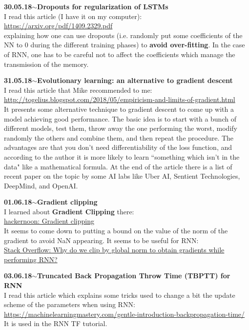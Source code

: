 \documentclass[11pt,a4paper]{article}
\newenvironment{loggentry}[2]%
{\noindent\textbf{#1}\hspace{1cm}$\mathbf{\sim}$\text{ }\textbf{#2}\\}{\vspace{0.5cm}}
\begin{document}
\begin{loggentry}{30.05.18}{Dropouts for regularization of LSTMs}
I read this article (I have it on my computer):\\
\url{https://arxiv.org/pdf/1409.2329.pdf}\\
explaining how one can use dropouts (i.e. randomly put some coefficients of the NN to 0 during the different training phases) to \textbf{avoid over-fitting}. In the case of RNN, one has to be careful not to affect the coefficients which manage the transmission of the memory.
\end{loggentry}

\begin{loggentry}{31.05.18}{Evolutionary learning: an alternative to gradient descent}
I read this article that Mike recommended to me:\\
\url{http://togelius.blogspot.com/2018/05/empiricism-and-limits-of-gradient.html}\\
It presents some alternative technique to gradient descent to come up with a model achieving good performance. The basic idea is to start with a bunch of different models, test them, throw away the one performing the worst, modify randomly the others and combine them, and then repeat the procedure. The advantages are that you don't need differentiability of the loss function, and according to the author it is more likely to learn ``something which isn't in the data" like a mathematical formula. At the end of the article there is a list of recent paper on the topic by some AI labs like Uber AI, Sentient Technologies, DeepMind, and OpenAI.\\
\end{loggentry}

\begin{loggentry}{01.06.18}{Gradient clipping}
I learned about \textbf{Gradient Clipping} there:\\
\href{https://hackernoon.com/gradient-clipping-57f04f0adae}{hackernoon: Gradient clipping}\\
It seems to come down to putting a bound on the value of the norm of the gradient to avoid NaN appearing. It seems to be useful for RNN:\\
\href{https://stackoverflow.com/questions/43561853/why-do-we-clip-by-global-norm-to-obtain-gradients-while-performing-rnn#43561977}{Stack Overflow: Why do we clip by global norm to obtain gradients while performing RNN?}
\end{loggentry}

\begin{loggentry}{03.06.18}{Truncated Back Propagation Throw Time (TBPTT) for RNN}
I read this article which explains some tricks used to change a bit the update scheme of the parameters when using RNN:\\
\url{https://machinelearningmastery.com/gentle-introduction-backpropagation-time/}\\
It is used in the RNN TF tutorial.
\end{loggentry}
\end{document}
